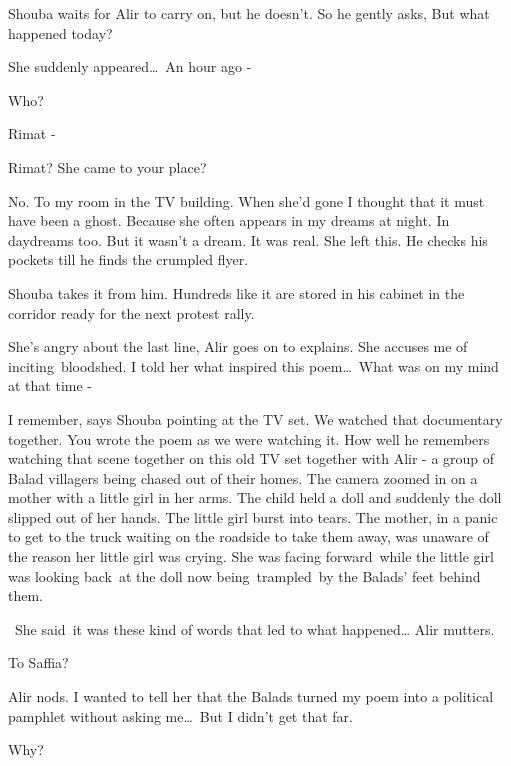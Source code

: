 \documentclass[letterpaper]{article}
\begin{document}
Shouba waits for Alir to carry on, but he doesn't. So he gently asks, {\textquotedbl}But what happened
today?{\textquotedbl} 

{\textquotedbl}She suddenly appeared{\dots}\ An hour ago -{\textquotedbl} 

{\textquotedbl}Who?{\textquotedbl} 

{\textquotedbl}Rimat -{\textquotedbl} 

{\textquotedbl}Rimat? She came to your place?{\textquotedbl} 

{\textquotedbl}No. To my room in the TV building. When she'd gone I thought that it must have been a ghost. Because she
often appears in my dreams at night. In daydreams too. But it wasn't a dream. It was real. She left
this.{\textquotedbl} He checks his pockets till he finds the crumpled flyer.

Shouba takes it from him. Hundreds like it are stored in his cabinet in the corridor ready for the next protest rally.\ 

{\textquotedbl}She's angry about the last line,{\textquotedbl} Alir goes on to explains. {\textquotedbl}She accuses me
of inciting~bloodshed. I told her what inspired this poem{\dots}\ What was on my mind at that time -{\textquotedbl}

{\textquotedbl}I remember,{\textquotedbl} says Shouba pointing at the TV set. {\textquotedbl}We watched that documentary
together. You wrote the poem as we were watching it.{\textquotedbl} How well he remembers watching that scene together
on this old TV set together with Alir {}-  a group of Balad villagers being chased out of their homes. The camera
zoomed in on a mother with a little girl in her arms. The child held a doll and suddenly the doll slipped out of her
hands. The little girl burst into tears. The mother, in a panic to get to the truck waiting on the roadside to take
them away, was unaware of the reason her little girl was crying. She was facing forward~while the little girl was
looking back~at the doll now being~trampled~by the Balads' feet behind them.

~{\textquotedbl}She said~it was these kind of words that led to what happened{\dots}{\textquotedbl} Alir mutters.

{\textquotedbl}To Saffia?{\textquotedbl} 

Alir nods. {\textquotedbl}I wanted to tell her that the Balads turned my poem into a political pamphlet without asking
me{\dots}\ But I didn't get that far.{\textquotedbl} 

{\textquotedbl}Why?{\textquotedbl} 
\end{document}
